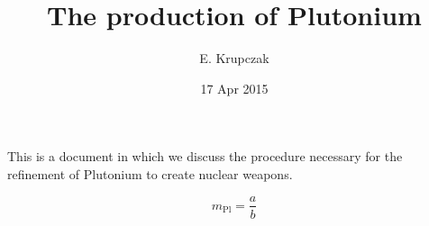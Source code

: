 \documentclass{article}
\title{The production of Plutonium}
\date{17 Apr 2015}
\author{E. Krupczak}
\begin{document}
\maketitle

This is a document in which we discuss the procedure necessary for the refinement of Plutonium to create nuclear weapons.

$$m_\text{Pl} = \frac{a}{b}$$
\end{document}
